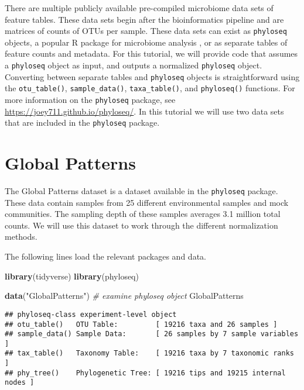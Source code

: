 \documentclass[
]{book}
\newenvironment{Shaded}{\begin{snugshade}}{\end{snugshade}}
\newcommand{\CommentTok}[1]{\textcolor[rgb]{0.56,0.35,0.01}{\textit{#1}}}
\newcommand{\KeywordTok}[1]{\textcolor[rgb]{0.13,0.29,0.53}{\textbf{#1}}}
\newcommand{\NormalTok}[1]{#1}
\newcommand{\StringTok}[1]{\textcolor[rgb]{0.31,0.60,0.02}{#1}}
\begin{document}
There are multiple publicly available pre-compiled microbiome data sets of feature tables. These data sets begin after the bioinformatics pipeline and are matrices of counts of OTUs per sample. These data sets can exist as \texttt{phyloseq} objects, a popular R package for microbiome analysis \citep{mcmurdie2013}, or as separate tables of feature counts and metadata. For this tutorial, we will provide code that assumes a \texttt{phyloseq} object as input, and outputs a normalized \texttt{phyloseq} object. Converting between separate tables and \texttt{phyloseq} objects is straightforward using the \texttt{otu\_table()}, \texttt{sample\_data()}, \texttt{taxa\_table()}, and \texttt{phyloseq()} functions. For more information on the \texttt{phyloseq} package, see \url{https://joey711.github.io/phyloseq/}. In this tutorial we will use two data sets that are included in the \texttt{phyloseq} package.

\hypertarget{global-patterns}{%
\section{Global Patterns}\label{global-patterns}}

The Global Patterns dataset \citep{caporaso2011} is a dataset available in the \texttt{phyloseq} package. These data contain samples from 25 different environmental samples and mock communities. The sampling depth of these samples averages 3.1 million total counts. We will use this dataset to work through the different normalization methods.

The following lines load the relevant packages and data.

\begin{Shaded}
\begin{Highlighting}[]
\KeywordTok{library}\NormalTok{(tidyverse)}
\KeywordTok{library}\NormalTok{(phyloseq)}

\KeywordTok{data}\NormalTok{(}\StringTok{"GlobalPatterns"}\NormalTok{)}
\CommentTok{\# examine phyloseq object }
\NormalTok{GlobalPatterns}
\end{Highlighting}
\end{Shaded}

\begin{verbatim}
## phyloseq-class experiment-level object
## otu_table()   OTU Table:         [ 19216 taxa and 26 samples ]
## sample_data() Sample Data:       [ 26 samples by 7 sample variables ]
## tax_table()   Taxonomy Table:    [ 19216 taxa by 7 taxonomic ranks ]
## phy_tree()    Phylogenetic Tree: [ 19216 tips and 19215 internal nodes ]
\end{verbatim}
\end{document}
